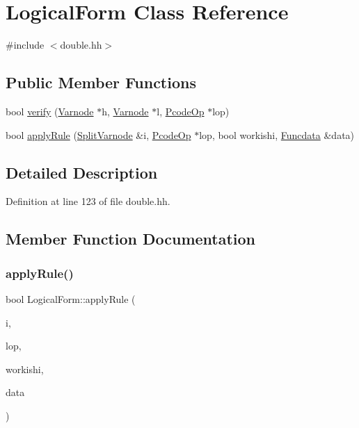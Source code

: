 \hypertarget{class_logical_form}{}\section{Logical\+Form Class Reference}
\label{class_logical_form}


{\ttfamily \#include $<$double.\+hh$>$}

\subsection*{Public Member Functions}
\begin{DoxyCompactItemize}
\item 
bool \mbox{\hyperlink{class_logical_form_a1f37791de1ba99923bd526c18f945a2f}{verify}} (\mbox{\hyperlink{class_varnode}{Varnode}} $\ast$h, \mbox{\hyperlink{class_varnode}{Varnode}} $\ast$l, \mbox{\hyperlink{class_pcode_op}{Pcode\+Op}} $\ast$lop)
\item 
bool \mbox{\hyperlink{class_logical_form_a1723130b5061eee9d95599b3dfb95463}{apply\+Rule}} (\mbox{\hyperlink{class_split_varnode}{Split\+Varnode}} \&i, \mbox{\hyperlink{class_pcode_op}{Pcode\+Op}} $\ast$lop, bool workishi, \mbox{\hyperlink{class_funcdata}{Funcdata}} \&data)
\end{DoxyCompactItemize}


\subsection{Detailed Description}


Definition at line 123 of file double.\+hh.



\subsection{Member Function Documentation}
\mbox{\label{class_logical_form_a1723130b5061eee9d95599b3dfb95463}} 
\subsubsection{\texorpdfstring{applyRule()}{applyRule()}}
{\footnotesize\ttfamily bool Logical\+Form\+::apply\+Rule (\begin{DoxyParamCaption}\item[{\mbox{\hyperlink{class_split_varnode}{Split\+Varnode}} \&}]{i,  }\item[{\mbox{\hyperlink{class_pcode_op}{Pcode\+Op}} $\ast$}]{lop,  }\item[{bool}]{workishi,  }\item[{\mbox{\hyperlink{class_funcdata}{Funcdata}} \&}]{data }\end{DoxyParamCaption})}



